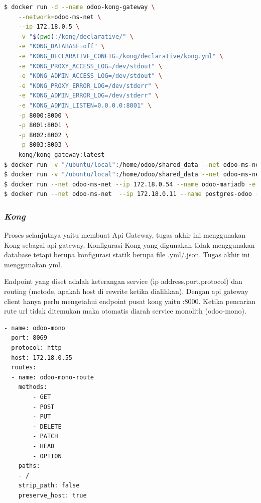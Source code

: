 \begin{lstlisting}[style=mystyle, language=sh, caption={Shell Script untuk pembuatan containe microservice }]
$ docker run -d --name odoo-kong-gateway \
	--network=odoo-ms-net \
	--ip 172.18.0.5 \
	-v "$(pwd):/kong/declarative/" \
	-e "KONG_DATABASE=off" \
	-e "KONG_DECLARATIVE_CONFIG=/kong/declarative/kong.yml" \
	-e "KONG_PROXY_ACCESS_LOG=/dev/stdout" \
	-e "KONG_ADMIN_ACCESS_LOG=/dev/stdout" \
	-e "KONG_PROXY_ERROR_LOG=/dev/stderr" \
	-e "KONG_ADMIN_ERROR_LOG=/dev/stderr" \
	-e "KONG_ADMIN_LISTEN=0.0.0.0:8001" \
	-p 8000:8000 \
	-p 8001:8001 \
	-p 8002:8002 \
	-p 8003:8003 \
	kong/kong-gateway:latest 
$ docker run -v "/ubuntu/local":/home/odoo/shared_data --net odoo-ms-net  --ip 172.18.0.55 --name odoo-mono -p :8069  -d odoo-mono
$ docker run -v "/ubuntu/local":/home/odoo/shared_data --net odoo-ms-net  --ip 172.18.0.57 --name odoo-web -p :8069 -d odoo-fe
$ docker run --net odoo-ms-net --ip 172.18.0.54 --name odoo-mariadb -e MYSQL_ROOT_PASSWORD=mariadb -p 3306:3306 -d mariadb 
$ docker run --net odoo-ms-net  --ip 172.18.0.11 --name postgres-odoo -e POSTGRES_PASSWORD=postgres -p 5432:5432 -d postgres
\end{lstlisting} 


\subsubsection{ \textit{Kong}}
Proses selanjutnya yaitu membuat Api Gateway, tugas akhir ini menggunakan Kong sebagai api gateway. Konfigurasi Kong yang digunakan tidak menggunakan database tetapi berupa konfigurasi statik berupa file .yml/.json. Tugas akhir ini menggunakan yml.

Endpoint yang diset adalah keterangan service (ip address,port,protocol) dan routing (metode, apakah host di rewrite ketika dialihkan). Dengan api gateway client hanya perlu mengetahui endpoint pusat kong yaitu :8000. Ketika pencarian rute url tidak ditemukan maka otomatis diarah service monolith (odoo-mono).

\begin{lstlisting}[style=mystyle, language=sh, caption={Konfigurasi Service Monolith }]
- name: odoo-mono
  port: 8069
  protocol: http
  host: 172.18.0.55
  routes:
  - name: odoo-mono-route
    methods:
        - GET
        - POST
        - PUT
        - DELETE
        - PATCH
        - HEAD
        - OPTION
    paths:
    - /
    strip_path: false
    preserve_host: true
\end{lstlisting} 

